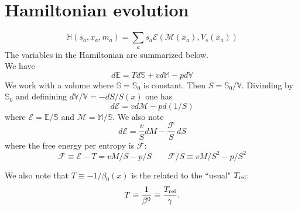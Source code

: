 \documentclass[12pt,aps,preprint,nofootinbib,noshowkeys,noshowpacs,longbibliography,superscriptaddress,tightenlines]{revtex4-2}
\def\Ebb{{\mathbb E}}
\def\Mbb{{\mathbb M}}
\def\Sbb{{\mathbb S}}
\def\Vbb{{\mathbb V}}
\def\F{{\mathcal F}}
\def\st{\begin{equation}}
\def\stp{\end{equation}}
\def\E{{\mathcal E}}
\def\M{{\mathcal M}}
\begin{document}
\section{Hamiltonian evolution}

\st
\label{eq:Hamiltonian}
\boxed{
{\mathbb H}(s_a, x_a, m_a)  = \sum_a s_a \E(\M(x_a), V_s(x_a))
}
\stp
The variables in the Hamiltonian are summarized below. \\

We have
\st
d\Ebb = Td{\Sbb} + v d\Mbb - p d\Vbb
\stp
We work with a volume where $\Sbb = \Sbb_0$ is constant. Then $S= \Sbb_0/\Vbb$.  Divinding by 
$\Sbb_0$ and definining $d\Vbb/\Vbb = -dS/S(x)$ one has 
\st
 d \E =  v d\M   - p d(1/S)
\stp
where $\E= \Ebb/\Sbb$ and $\M = \Mbb/\Sbb$.   We 
also note 
\st
d \E =  \frac{v}{S} dM  - \frac{\F}{S}\, dS
\stp
where the free energy per entropy is $\F$:
\st
\mathcal F \equiv \E - T =  v M/S - p/S   \qquad \F/S \equiv v M/S^2 - p/S^2
\stp

We also note that $T\equiv-1/\beta_0(x)$ is the related to the ``usual" $T_{\rm rel}$:
\st
T \equiv \frac{1}{\beta^0} \equiv \frac{T_{\rm rel}}{\gamma}.
\stp
%
\end{document}
